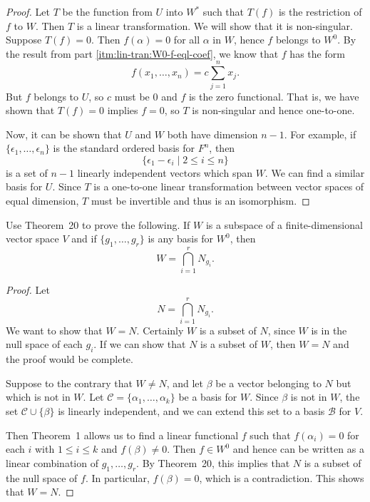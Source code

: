 \begin{enumerate}
\begin{proof}
    Let $T$ be the function from $U$ into $W^*$ such that $T(f)$ is
    the restriction of $f$ to $W$. Then $T$ is a linear
    transformation. We will show that it is non-singular. Suppose
    $T(f) = 0$. Then $f(\alpha) = 0$ for all $\alpha$ in $W$, hence
    $f$ belongs to $W^0$. By the result from part
    \ref{itm:lin-tran:W0-f-eql-coef}, we know that $f$ has the form
    \begin{equation*}
      f(x_1,\dots,x_n) = c\sum_{j=1}^nx_j.
    \end{equation*}
    But $f$ belongs to $U$, so $c$ must be $0$ and $f$ is the zero
    functional. That is, we have shown that $T(f) = 0$ implies
    $f = 0$, so $T$ is non-singular and hence one-to-one.

    Now, it can be shown that $U$ and $W$ both have dimension
    $n-1$. For example, if $\{\epsilon_1,\dots,\epsilon_n\}$ is the
    standard ordered basis for $F^n$, then
    \begin{equation*}
      \{\epsilon_1 - \epsilon_i \mid 2\leq i\leq n\}
    \end{equation*}
    is a set of $n - 1$ linearly independent vectors which span
    $W$. We can find a similar basis for $U$. Since $T$ is a
    one-to-one linear transformation between vector spaces of equal
    dimension, $T$ must be invertible and thus is an isomorphism.
  \end{proof}
\end{enumerate}

 Use Theorem~20 to prove the following. If $W$ is a subspace
of a finite-dimensional vector space $V$ and if $\{g_1,\dots,g_r\}$ is
any basis for $W^0$, then
\begin{equation*}
  W = \bigcap_{i=1}^rN_{g_i}.
\end{equation*}
\begin{proof}
  Let
  \begin{equation*}
    N = \bigcap_{i=1}^rN_{g_i}.
  \end{equation*}
  We want to show that $W = N$. Certainly $W$ is a subset of $N$,
  since $W$ is in the null space of each $g_i$. If we can show that
  $N$ is a subset of $W$, then $W = N$ and the proof would be
  complete.

  Suppose to the contrary that $W \neq N$, and let $\beta$ be a vector
  belonging to $N$ but which is not in $W$. Let
  $\mathcal{C} = \{\alpha_1, \dots, \alpha_k\}$ be a basis for
  $W$. Since $\beta$ is not in $W$, the set $\mathcal{C}\cup\{\beta\}$
  is linearly independent, and we can extend this set to a basis
  $\mathcal{B}$ for $V$.

  Then Theorem~1 allows us to find a linear functional $f$ such that
  $f(\alpha_i) = 0$ for each $i$ with $1\leq i\leq k$ and
  $f(\beta)\neq0$. Then $f\in W^0$ and hence can be written as a
  linear combination of $g_1, \dots, g_r$. By Theorem~20, this implies
  that $N$ is a subset of the null space of $f$. In particular,
  $f(\beta) = 0$, which is a contradiction. This shows that $W = N$.
\end{proof}

